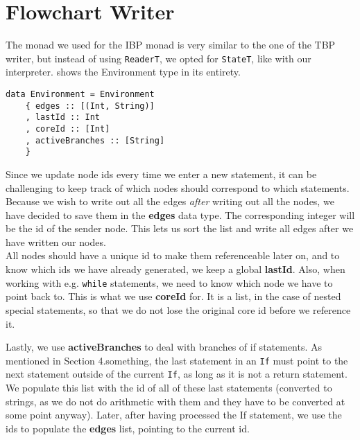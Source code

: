 \section{Flowchart Writer}

The monad we used for the IBP monad is very similar to the one of the TBP writer, but instead of using \texttt{ReaderT}, we opted for \texttt{StateT}, like with our interpreter.  shows the Environment type in its entirety. \\

\begin{lstlisting}[caption={The IBP monad's environment type.}, captionpos=b, label={The IBP monad's environment type}]
data Environment = Environment
    { edges :: [(Int, String)]
    , lastId :: Int
    , coreId :: [Int]
    , activeBranches :: [String]
    }    
\end{lstlisting}

Since we update node ids every time we enter a new statement, it can be challenging to keep track of which nodes should correspond to which statements. Because we wish to write out all the edges \textit{after} writing out all the nodes, we have decided to save them in the \textbf{edges} data type. The corresponding integer will be the id of the sender node. This lets us sort the list and write all edges after we have written our nodes. \\

All nodes should have a unique id to make them referenceable later on, and to know which ids we have already generated, we keep a global \textbf{lastId}. Also, when working with e.g. \texttt{while} statements, we need to know which node we have to point back to. This is what we use \textbf{coreId} for. It is a list, in the case of nested special statements, so that we do not lose the original core id before we reference it. \\


Lastly, we use \textbf{activeBranches} to deal with branches of if statements. As mentioned in Section 4.something, the last statement in an \texttt{If} must point to the next statement outside of the current \texttt{If}, as long as it is not a return statement. We populate this list with the id of all of these last statements (converted to strings, as we do not do arithmetic with them and they have to be converted at some point anyway). Later, after having processed the If statement, we use the ids to populate the \textbf{edges} list, pointing to the current id.

